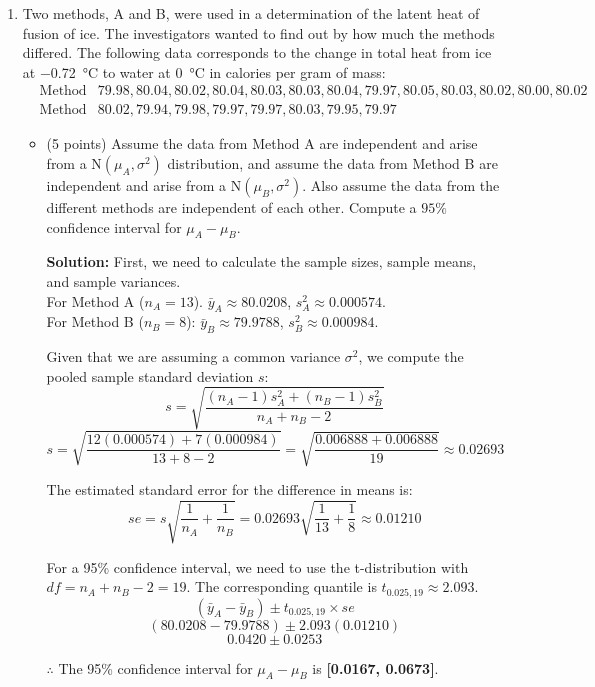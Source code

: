 \documentclass[12pt,letterpaper]{article}
\begin{document}
\begin{enumerate}[leftmargin=*]
\item Two methods, A and B, were used in a determination of the latent heat of fusion of ice. The investigators wanted to find out by how much the methods differed. The following data corresponds to the change in total heat from ice at \SI{-0.72}{\celsius} to water at \SI{0}{\celsius} in calories per gram of mass:
\begin{eqnarray*}
& \text{Method A:} & 79.98, 80.04, 80.02, 80.04, 80.03, 80.03, 80.04, 79.97, 80.05, 80.03, 80.02, 80.00, 80.02 \\
& \text{Method B:} & 80.02, 79.94, 79.98, 79.97, 79.97, 80.03, 79.95, 79.97
\end{eqnarray*}
\begin{itemize}
	\item[(a)] (5 points) Assume the data from Method A are independent and arise from a $\text{N}(\mu_A, \sigma^2)$ distribution, and assume the data from Method B are independent and arise from a $\text{N}(\mu_B, \sigma^2)$. Also assume the data from the different methods are independent of each other. Compute a $95\%$ confidence interval for $\mu_A - \mu_B$.
 
 \textbf{Solution:}
 First, we need to calculate the sample sizes, sample means, and sample variances.\\
 For Method A ($n_A = 13$). $\bar{y}_A \approx 80.0208$, $s_A^2 \approx 0.000574$.\\
 For Method B ($n_B = 8$): $\bar{y}_B \approx 79.9788$, $s_B^2 \approx 0.000984$.
 
 Given that we are assuming a common variance $\sigma^2$, we compute the pooled sample standard deviation $s$:
 \[ s = \sqrt{\frac{(n_A-1)s_A^2 + (n_B-1)s_B^2}{n_A + n_B - 2}} \]
 \[ s = \sqrt{\frac{12(0.000574) + 7(0.000984)}{13 + 8 - 2}} = \sqrt{\frac{0.006888 + 0.006888}{19}} \approx 0.02693 \]
 
 The estimated standard error for the difference in means is:
 \[ se = s \sqrt{\frac{1}{n_A} + \frac{1}{n_B}} = 0.02693 \sqrt{\frac{1}{13} + \frac{1}{8}} \approx 0.01210 \]
 
 For a 95\% confidence interval, we need to use the t-distribution with $df = n_A + n_B - 2 = 19$. The corresponding quantile is $t_{0.025, 19} \approx 2.093$.
 \[ (\bar{y}_A - \bar{y}_B) \pm t_{0.025, 19} \times se \]
 \[ (80.0208 - 79.9788) \pm 2.093(0.01210) \]
 \[ 0.0420 \pm 0.0253 \]
 
 $\therefore$ The 95\% confidence interval for $\mu_A - \mu_B$ is \textbf{[0.0167, 0.0673]}.


\end{itemize}
\end{enumerate}
\end{document}
